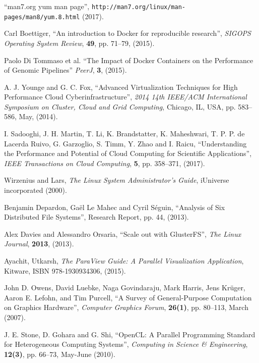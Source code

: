 \documentclass[twoside,a4paper,12pt,english]{inac19}
\begin{document}
\begin{thebibliography}{99}
 ``man7.org yum man page'', \verb#http://man7.org/linux/man-pages/man8/yum.8.html# (2017).
  
 Carl Boettiger, ``An introduction to Docker for reproducible research'', \textit{SIGOPS Operating System Review}, \textbf{49}, pp. 71--79, (2015).

 Paolo Di Tommaso et al. ``The Impact of Docker Containers on the Performance of Genomic Pipelines'' \textit{PeerJ}, \textbf{3}, (2015).

 A. J. Younge and G. C. Fox, ``Advanced Virtualization Techniques for High Performance Cloud Cyberinfrastructure'', \textit{2014 14th IEEE/ACM International Symposium on Cluster, Cloud and Grid Computing}, Chicago, IL, USA, pp. 583--586, May, (2014).
  
 I. Sadooghi, J. H. Martin, T. Li, K. Brandstatter, K. Maheshwari, T. P. P. de Lacerda Ruivo, G. Garzoglio, S. Timm, Y. Zhao and I. Raicu, ``Understanding the Performance and Potential of Cloud Computing for Scientific Applications'', \textit{IEEE Transactions on Cloud Computing}, \textbf{5}, pp. 358--371, (2017).
  
 Wirzenius and Lars, \textit{The  Linux System Administrator's Guide}, iUniverse incorporated (2000).

 Benjamin Depardon, Ga\"{e}l Le Mahec and Cyril S\'{e}guin, ``Analysis of Six Distributed File Systems'', Research Report, pp. 44, (2013).
  
 Alex Davies and Alessandro Orsaria, ``Scale out with GlusterFS'', \textit{The Linux Journal}, \textbf{2013}, (2013).


 Ayachit, Utkarsh, \textit{The ParaView Guide: A Parallel Visualization Application}, Kitware, ISBN 978-1930934306, (2015).

  John D. Owens, David Luebke, Naga Govindaraju, Mark Harris, Jens Kr\"{u}ger, Aaron E. Lefohn, and Tim Purcell, ``A Survey of General-Purpose Computation on Graphics Hardware'', \textit{Computer Graphics Forum}, \textbf{26(1)}, pp. 80--113, March (2007).

 J. E. Stone, D. Gohara and G. Shi, ``OpenCL: A Parallel Programming Standard for Heterogeneous Computing Systems'', \textit{Computing in Science \& Engineering}, \textbf{12(3)}, pp. 66--73, May-June (2010).

    
\end{thebibliography}

%
%
\end{document}
